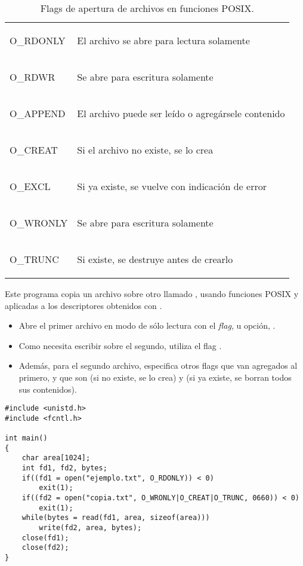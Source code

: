  \begin{table} 
 \centering 
 \small
 \begin{tabular}{l|l}
\begin{codecell}
O_RDONLY
\end{codecell} & El archivo se abre para lectura solamente\\
\begin{codecell}
O_RDWR
\end{codecell}   & Se abre para escritura solamente\\
\begin{codecell}
O_APPEND
\end{codecell} & El archivo puede ser leído o agregársele contenido\\
\begin{codecell}
O_CREAT
\end{codecell}  & Si el archivo no existe, se lo crea\\
\begin{codecell}
O_EXCL
\end{codecell}   & Si ya existe, se vuelve con indicación de error\\
\begin{codecell}
O_WRONLY
\end{codecell} & Se abre para escritura solamente\\
\begin{codecell}
O_TRUNC
\end{codecell}  & Si existe, se destruye antes de crearlo\\

 \end{tabular}
 \caption{Flags de apertura de archivos en funciones POSIX.}
 \label{tab:flags} 
 \end{table} 
 
\begin{ejemplo}
Este programa copia un archivo  sobre otro llamado , usando funciones POSIX  y  aplicadas a los descriptores obtenidos con .
\begin{itemize}
	\item Abre el primer archivo en modo de sólo lectura con el \textit{flag}, u opción, .
	\item Como necesita escribir sobre el segundo, utiliza el flag
. 
	\item Además, para el segundo archivo, especifica otros flags que van
agregados al primero, y que son  (si no existe, se lo crea) y  (si
ya existe, se borran todos sus contenidos).
\end{itemize}
\begin{lstlisting}
#include <unistd.h>
#include <fcntl.h>

int main()
{
    char area[1024];
    int fd1, fd2, bytes;
    if((fd1 = open("ejemplo.txt", O_RDONLY)) < 0)
        exit(1);
    if((fd2 = open("copia.txt", O_WRONLY|O_CREAT|O_TRUNC, 0660)) < 0)
        exit(1);
    while(bytes = read(fd1, area, sizeof(area)))
        write(fd2, area, bytes);
    close(fd1);
    close(fd2);
}
\end{lstlisting}
\end{ejemplo}


